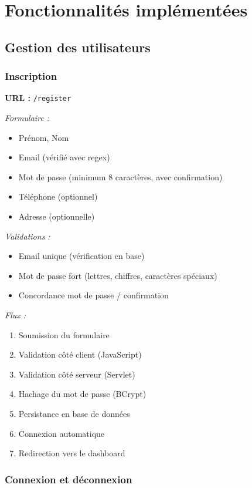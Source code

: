 \documentclass[12pt,a4paper]{report}
\begin{document}
\section{Fonctionnalités implémentées}

\subsection{Gestion des utilisateurs}

\subsubsection{Inscription}

\textbf{URL :} \texttt{/register}

\textit{Formulaire :}
\begin{itemize}
    \item Prénom, Nom
    \item Email (vérifié avec regex)
    \item Mot de passe (minimum 8 caractères, avec confirmation)
    \item Téléphone (optionnel)
    \item Adresse (optionnelle)
\end{itemize}

\textit{Validations :}
\begin{itemize}
    \item Email unique (vérification en base)
    \item Mot de passe fort (lettres, chiffres, caractères spéciaux)
    \item Concordance mot de passe / confirmation
\end{itemize}

\textit{Flux :}
\begin{enumerate}
    \item Soumission du formulaire
    \item Validation côté client (JavaScript)
    \item Validation côté serveur (Servlet)
    \item Hachage du mot de passe (BCrypt)
    \item Persistance en base de données
    \item Connexion automatique
    \item Redirection vers le dashboard
\end{enumerate}

\subsubsection{Connexion et déconnexion}
\end{document}
